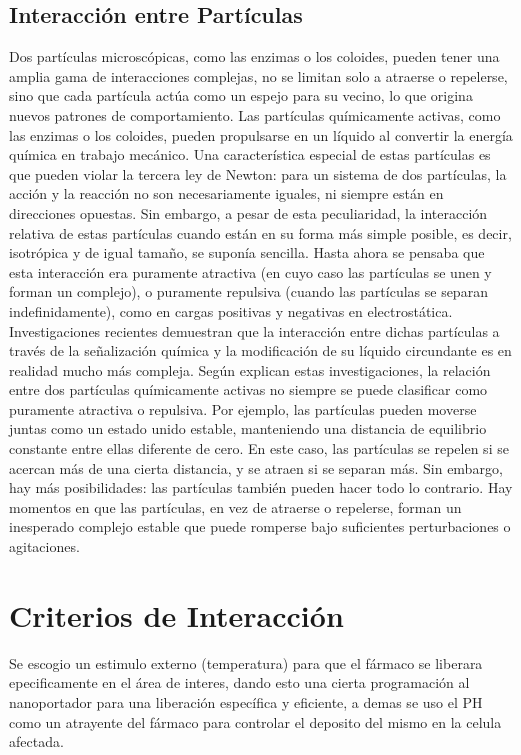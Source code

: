 \documentclass[a4paper,fleqn]{cas-sc}
\begin{document}
\subsection{Interacción entre Partículas}
Dos partículas microscópicas, como las enzimas o los coloides, pueden tener una amplia gama de interacciones complejas, no se limitan solo a atraerse o repelerse, sino que cada partícula actúa como un espejo para su vecino, lo que origina nuevos patrones de comportamiento. Las partículas químicamente activas, como las enzimas o los coloides, pueden propulsarse en un líquido al convertir la energía química en trabajo mecánico. Una característica especial de estas partículas es que pueden violar la tercera ley de Newton: para un sistema de dos partículas, la acción y la reacción no son necesariamente iguales, ni siempre están en direcciones opuestas.
Sin embargo, a pesar de esta peculiaridad, la interacción relativa de estas partículas cuando están en su forma más simple posible, es decir, isotrópica y de igual tamaño, se suponía sencilla. Hasta ahora se pensaba que esta interacción era puramente atractiva (en cuyo caso las partículas se unen y forman un complejo), o puramente repulsiva (cuando las partículas se separan indefinidamente), como en cargas positivas y negativas en electrostática. Investigaciones recientes demuestran que la interacción entre dichas partículas a través de la señalización química y la modificación de su líquido circundante es en realidad mucho más compleja.
Según explican estas investigaciones, la relación entre dos partículas químicamente activas no siempre se puede clasificar como puramente atractiva o repulsiva. Por ejemplo, las partículas pueden moverse juntas como un estado unido estable, manteniendo una distancia de equilibrio constante entre ellas diferente de cero. En este caso, las partículas se repelen si se acercan más de una cierta distancia, y se atraen si se separan más.
Sin embargo, hay más posibilidades: las partículas también pueden hacer todo lo contrario.
Hay momentos en que las partículas, en vez de atraerse o repelerse, forman un inesperado complejo estable que puede romperse bajo suficientes perturbaciones o agitaciones.


\section{Criterios de Interacción}
Se escogio un estimulo externo (temperatura) para que el fármaco se liberara epecificamente en el área de interes, dando esto una cierta programación al nanoportador para una liberación específica y eficiente, a demas se uso el PH como un atrayente del fármaco para controlar el deposito del mismo en la celula afectada. 
\end{document}
